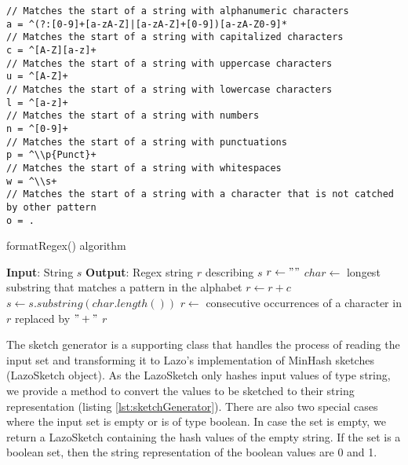 \begin{itemize}
    \begin{lstlisting}[caption=Alphabet of the regex, numbers=none, label=lst:patterns]
// Matches the start of a string with alphanumeric characters
a = ^(?:[0-9]+[a-zA-Z]|[a-zA-Z]+[0-9])[a-zA-Z0-9]*
// Matches the start of a string with capitalized characters
c = ^[A-Z][a-z]+
// Matches the start of a string with uppercase characters
u = ^[A-Z]+
// Matches the start of a string with lowercase characters
l = ^[a-z]+
// Matches the start of a string with numbers
n = ^[0-9]+
// Matches the start of a string with punctuations
p = ^\\p{Punct}+
// Matches the start of a string with whitespaces
w = ^\\s+
// Matches the start of a string with a character that is not catched by other pattern
o = .
    \end{lstlisting}

    \begin{algorithm}
    \caption{formatRegex() algorithm}
    \label{alg:formatRegex}
        \begin{algorithmic}[1]
\STATE \textbf{Input}: String $s$
\STATE \textbf{Output}: Regex string $r$ describing $s$
\STATE $r \gets ""$
\STATE $char \gets$ longest substring that matches a pattern in the alphabet
\STATE $r \gets r + c$
\STATE $s \gets s.substring(char.length())$
\ENDWHILE
\STATE $r \gets $ consecutive occurrences of a character in $r$ replaced by $"+"$
\RETURN $r$
            
        \end{algorithmic}
    \end{algorithm}
    
\end{itemize}

The sketch generator is a supporting class that handles the process of reading the input set and transforming it to Lazo's implementation of MinHash sketches (LazoSketch object). As the LazoSketch only hashes input values of type string, we provide a method to convert the values to be sketched to their string representation (listing \ref{lst:sketchGenerator}). There are also two special cases where the input set is empty or is of type boolean. In case the set is empty, we return a LazoSketch containing the hash values of the empty string. If the set is a boolean set, then the string representation of the boolean values are 0 and 1.


